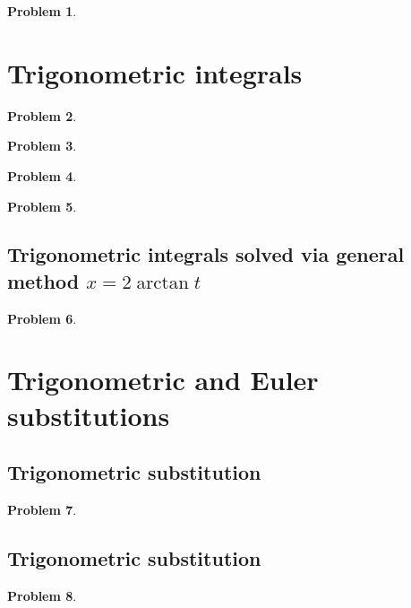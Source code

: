 \documentclass{article}
\newtheorem{problem}{Problem}
\begin{document}
\begin{problem}

\end{problem}
\section{Trigonometric integrals}
\begin{problem}

\end{problem}

\begin{problem}

\end{problem}

\begin{problem}

\end{problem}

\begin{problem}

\end{problem}
\subsection{Trigonometric integrals solved via general method $x=2\arctan t$}
\begin{problem}

\end{problem}


\section{Trigonometric and Euler substitutions}
\subsection{Trigonometric substitution}
\begin{problem}

\end{problem}


\subsection{Trigonometric substitution}
\begin{problem}

\end{problem}

\end{document}
